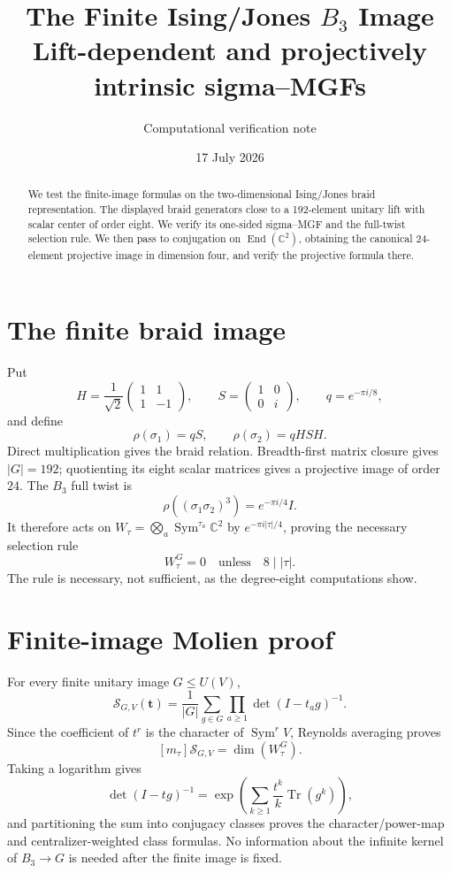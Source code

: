 \documentclass[11pt]{article}
\title{\color{navy}\bfseries The Finite Ising/Jones $B_3$ Image\\
\large Lift-dependent and projectively intrinsic sigma--MGFs}
\author{Computational verification note}\date{17 July 2026}
\newcommand{\Sgm}{\mathcal S}
\begin{document}
\maketitle

\begin{abstract}
We test the finite-image formulas on the two-dimensional Ising/Jones braid
representation.  The displayed braid generators close to a 192-element
unitary lift with scalar center of order eight.  We verify its one-sided
sigma--MGF and the full-twist selection rule.  We then pass to conjugation on
$\operatorname{End}(\mathbb C^2)$, obtaining the canonical 24-element
projective image in dimension four, and verify the projective formula there.
\end{abstract}

\section{The finite braid image}
Put
\[
 H=\frac1{\sqrt2}\begin{pmatrix}1&1\\1&-1\end{pmatrix},\qquad
 S=\begin{pmatrix}1&0\\0&i\end{pmatrix},\qquad q=e^{-\pi i/8},
\]
and define
\[
 \rho(\sigma_1)=qS,\qquad \rho(\sigma_2)=qHSH.
\]
Direct multiplication gives the braid relation.  Breadth-first matrix closure
gives $|G|=192$; quotienting its eight scalar matrices gives a projective image
of order $24$.  The $B_3$ full twist is
\[
 \rho((\sigma_1\sigma_2)^3)=e^{-\pi i/4}I.
\]
It therefore acts on
$W_\tau=\bigotimes_a\operatorname{Sym}^{\tau_a}\mathbb C^2$ by
$e^{-\pi i|\tau|/4}$, proving the necessary selection rule
\[
 \boxed{W_\tau^G=0\quad\text{unless}\quad8\mid|\tau|.}
\]
The rule is necessary, not sufficient, as the degree-eight computations show.

\section{Finite-image Molien proof}
For every finite unitary image $G\leq U(V)$,
\[
 \Sgm_{G,V}(\mathbf t)=\frac1{|G|}\sum_{g\in G}
 \prod_{a\geq1}\det(I-t_ag)^{-1}.
\]
Since the coefficient of $t^r$ is the character of
$\operatorname{Sym}^rV$, Reynolds averaging proves
\[
 [m_\tau]\Sgm_{G,V}=\dim(W_\tau^G).
\]
Taking a logarithm gives
\[
 \det(I-tg)^{-1}=\exp\left(\sum_{k\geq1}
 \frac{t^k}{k}\operatorname{Tr}(g^k)\right),
\]
and partitioning the sum into conjugacy classes proves the character/power-map
and centralizer-weighted class formulas.  No information about the infinite
kernel of $B_3\to G$ is needed after the finite image is fixed.
\end{document}
